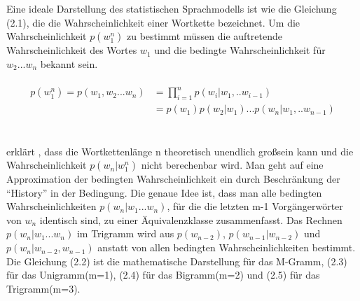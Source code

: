 Eine ideale Darstellung des statistischen Sprachmodells ist wie die Gleichung (2.1), die die Wahrscheinlichkeit einer Wortkette bezeichnet. Um die Wahrscheinlichkeit $p(w_{1}^n)$ zu bestimmt m\"ussen die auftretende Wahrscheinlichkeit des Wortes $w_{1}$ und die bedingte Wahrscheinlichkeit f\"ur $w_{2}...w_{n}$ bekannt sein.
\\
\\
\begin{align}
p(w_{1}^n) = p(w_{1},w_{2}...w_{n}) &= \prod_{i=1}^n p(w_{i}|w_{1},..w_{i-1}) \nonumber\\
&= p(w_{1})p(w_{2}|w_{1})...p(w_{n}|w_{1},..w_{n-1})
\end{align}
\\
\\
\cite{book_speech} erkl\"art , dass die Wortkettenl\"ange n theoretisch unendlich gro\ss  sein kann und die Wahrscheinlichkeit $p(w_{n}|w_{1}^n)$ nicht berechenbar wird. Man geht auf eine Approximation der bedingten Wahrscheinlichkeit ein durch Beschr\"ankung der "`History"' in der Bedingung. Die genaue Idee ist, dass man alle bedingten Wahrscheinlichkeiten $p(w_{n}|w_{1}...w_{n})$, f\"ur die die letzten m-1 Vorg\"angerw\"orter von $w_{n}$ identisch sind, zu einer \"Aquivalenzklasse zusammenfasst. Das Rechnen $p(w_{n}|w_{1}...w_{n})$ im Trigramm wird aus $p(w_{n-2})$, $p(w_{n-1}|w_{n-2})$ und $p(w_{n}|w_{n-2},w_{n-1})$ anstatt von allen bedingten Wahrscheinlichkeiten bestimmt. 
Die Gleichung (2.2) ist die mathematische Darstellung f\"ur das M-Gramm, (2.3) f\"ur das Unigramm(m=1), (2.4) f\"ur das Bigramm(m=2) und (2.5) f\"ur das Trigramm(m=3).

